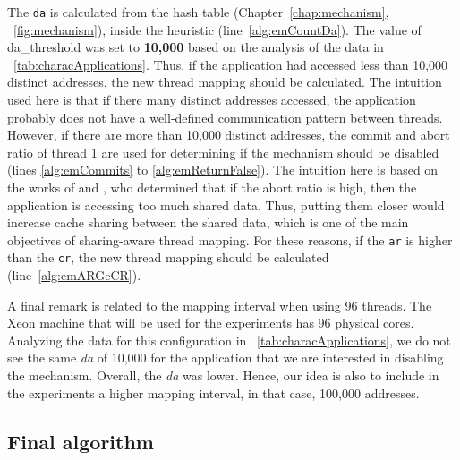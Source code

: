 The \texttt{da} is calculated from the hash table (Chapter~\ref{chap:mechanism}, \figurename~\ref{fig:mechanism}), inside the heuristic (line~\ref{alg:emCountDa}). The value of da\_threshold was set to \textbf{10,000} based on the analysis of the data in \tablename~\ref{tab:characApplications}. Thus, if the application had accessed less than 10,000 distinct addresses, the new thread mapping should be calculated. The intuition used here is that if there many distinct addresses accessed, the application probably does not have a well-defined communication pattern between threads. However, if there are more than 10,000 distinct addresses, the commit and abort ratio of thread 1 are used for determining if the mechanism should be disabled (lines \ref{alg:emCommits} to \ref{alg:emReturnFalse}). The intuition here is based on the works of  and , who determined that if the abort ratio is high, then the application is accessing too much shared data. Thus, putting them closer would increase cache sharing between the shared data, which is one of the main objectives of sharing-aware thread mapping. For these reasons, if the  \texttt{ar} is higher than the  \texttt{cr}, the new thread mapping should be calculated (line~\ref{alg:emARGeCR}).

A final remark is related to the mapping interval when using 96 threads. The Xeon machine that will be used for the experiments has 96 physical cores. Analyzing the data for this configuration in \tablename~\ref{tab:characApplications}, we do not see the same \textit{da} of 10,000 for the application that we are interested in disabling the mechanism. Overall, the \textit{da} was lower. Hence, our idea is also to include in the experiments a higher mapping interval, in that case, 100,000 addresses. %

\subsection{Final algorithm}\label{sect:finalAlgorithmOnlineMap}

